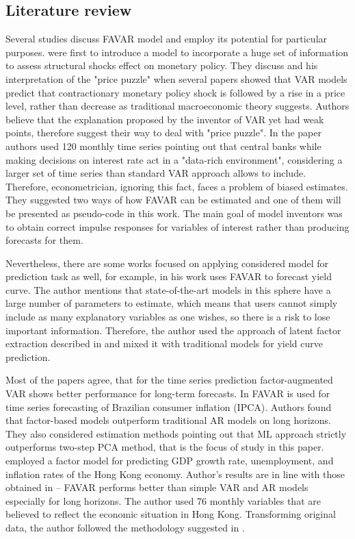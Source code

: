 \documentclass[a4paper, 14pt]{article}
\begin{document}
\subsection{Literature review}
Several studies discuss FAVAR model and employ its potential for particular purposes. \cite{bernanke2005measuring} were first to introduce a model to incorporate a huge set of information to assess structural shocks effect on monetary policy. They discuss \cite{sims1992interpreting} and his interpretation of the "price puzzle" when several papers showed that VAR models predict that contractionary monetary policy shock is followed by a rise in a price level, rather than decrease as traditional macroeconomic theory suggests. Authors believe that the explanation proposed by the inventor of VAR yet had weak points, therefore suggest their way to deal with "price puzzle". In the paper authors used 120 monthly time series pointing out that central banks while making decisions on interest rate act in a "data-rich environment", considering a larger set of time series than standard VAR approach allows to include. Therefore, econometrician, ignoring this fact, faces a problem of biased estimates. They suggested two ways of how FAVAR can be estimated and one of them will be presented as pseudo-code in this work. The main goal of model inventors was to obtain correct impulse responses for variables of interest rather than producing forecasts for them. 

Nevertheless, there are some works focused on applying considered model for prediction task as well, for example,  \cite{monch2008forecasting} in his work uses FAVAR to forecast yield curve. The author mentions that state-of-the-art models in this sphere have a large number of parameters to estimate, which means that users cannot simply include as many explanatory variables as one wishes, so there is a risk to lose important information. Therefore, the author used the approach of latent factor extraction described in \cite{bernanke2005measuring} and mixed it with traditional models for yield curve prediction. 

Most of the papers agree, that for the time series prediction factor-augmented VAR shows better performance for long-term forecasts. In \cite{figueiredo2013forecasting} FAVAR is used for time series forecasting of Brazilian consumer inflation (IPCA). Authors found that factor-based models outperform traditional AR models on long horizons. They also considered estimation methods pointing out that ML approach strictly outperforms two-step PCA method, that is the focus of study in this paper. \cite{pang2010forecasting} employed a factor model for predicting GDP growth rate, unemployment, and inflation rates of the Hong Kong economy. Author's results are in line with those obtained in \cite{figueiredo2013forecasting} -- FAVAR performs better than simple VAR and AR models especially for long horizons. The author used 76 monthly variables that are believed to reflect the economic situation in Hong Kong. Transforming original data, the author followed the methodology suggested in \cite{stock2005implications}.
\end{document}
